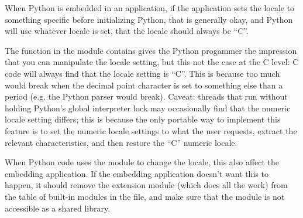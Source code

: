 When Python is embedded in an application, if the application sets the
locale to something specific before initializing Python, that is
generally okay, and Python will use whatever locale is set,
 that the  locale should always be
``C''.

The  function in the  module contains
gives the Python progammer the impression that you can manipulate the
 locale setting, but this not the case at the C
level: C code will always find that the  locale
setting is ``C''.  This is because too much would break when the
decimal point character is set to something else than a period
(e.g. the Python parser would break).  Caveat: threads that run
without holding Python's global interpreter lock may occasionally find
that the numeric locale setting differs; this is because the only
portable way to implement this feature is to set the numeric locale
settings to what the user requests, extract the relevant
characteristics, and then restore the ``C'' numeric locale.

When Python code uses the  module to change the locale,
this also affect the embedding application.  If the embedding
application doesn't want this to happen, it should remove the
 extension module (which does all the work) from the
table of built-in modules in the  file, and make sure
that the  module is not accessible as a shared library.
